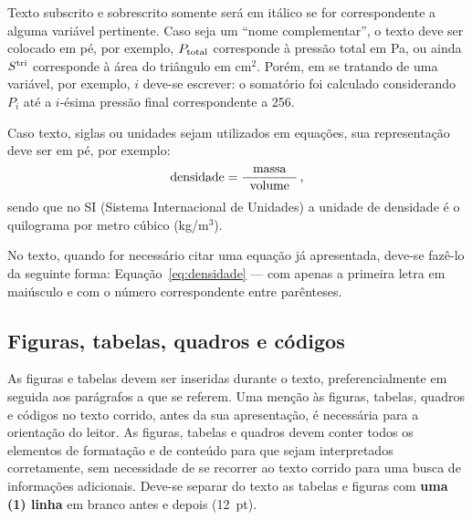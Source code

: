 \documentclass[12pt, a4paper, twoside, twocolumn]{article}
\begin{document}
Texto subscrito e sobrescrito somente será em itálico se for correspondente a alguma variável pertinente. Caso seja um ``nome complementar'', o texto deve ser colocado em pé, por exemplo, $P_{\text{total}}$ corresponde à pressão total em Pa, ou ainda $S^{\text{tri}}$ corresponde à área do triângulo em cm$^2$. Porém, em se tratando de uma variável, por exemplo, $i$ deve-se escrever: o somatório foi calculado considerando $P_i$ até a $i$-ésima pressão final correspondente a 256.

Caso texto, siglas ou unidades sejam utilizados em equações, sua representação deve ser em pé, por exemplo:
%
\begin{equation}
	\text{densidade} = \frac{\text{massa}}{\;\;\text{volume}\;\;}\,,
\label{eq:densidade}
\end{equation}
%
sendo que no SI (Sistema Internacional de Unidades) a unidade de densidade é o quilograma por metro cúbico (kg/m$^3$).
%

No texto, quando for necessário citar uma equação já apresentada, deve-se fazê-lo da seguinte forma: Equação~\eqref{eq:densidade} --- com apenas a primeira letra em maiúsculo e com o número correspondente entre parênteses.

\subsection{Figuras, tabelas, quadros e códigos}



As figuras e tabelas devem ser inseridas durante o texto, preferencialmente em seguida aos parágrafos a que se referem. Uma menção
às figuras, tabelas, quadros e códigos no texto corrido, antes da sua apresentação, é necessária para a orientação do leitor. As figuras, tabelas e quadros devem conter todos os elementos de formatação e de conteúdo para que sejam interpretados corretamente, sem necessidade de se recorrer ao texto corrido para uma busca de informações adicionais. Deve-se separar do texto as tabelas e figuras com \textbf{uma (1) linha} em branco antes e depois (12~pt). 

\end{document}
